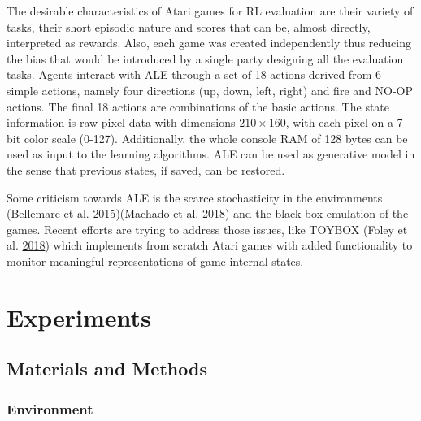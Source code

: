 \documentclass[
  12pt,
  openany]{book}
\begin{document}
The desirable characteristics of Atari games for RL evaluation are their variety of tasks, their short episodic nature and scores that can be, almost directly, interpreted as rewards. Also, each game was created independently thus reducing the bias that would be introduced by a single party designing all the evaluation tasks. Agents interact with ALE through a set of 18 actions derived from 6 simple actions, namely four directions (up, down, left, right) and fire and NO-OP actions. The final 18 actions are combinations of the basic actions. The state information is raw pixel data with dimensions \(210 \times 160\), with each pixel on a 7-bit color scale (0-127). Additionally, the whole console RAM of 128 bytes can be used as input to the learning algorithms. ALE can be used as generative model in the sense that previous states, if saved, can be restored.

Some criticism towards ALE is the scarce stochasticity in the environments (Bellemare et al. \protect\hyperlink{ref-bellemare2015arcade}{2015})(Machado et al. \protect\hyperlink{ref-machado2018revisiting}{2018}) and the black box emulation of the games. Recent efforts are trying to address those issues, like TOYBOX (Foley et al. \protect\hyperlink{ref-foley2018toybox}{2018}) which implements from scratch Atari games with added functionality to monitor meaningful representations of game internal states.

\hypertarget{experiments}{%
\chapter{Experiments}\label{experiments}}

\hypertarget{materials-and-methods}{%
\section{Materials and Methods}\label{materials-and-methods}}

\hypertarget{environment}{%
\subsection{Environment}\label{environment}}
\end{document}
